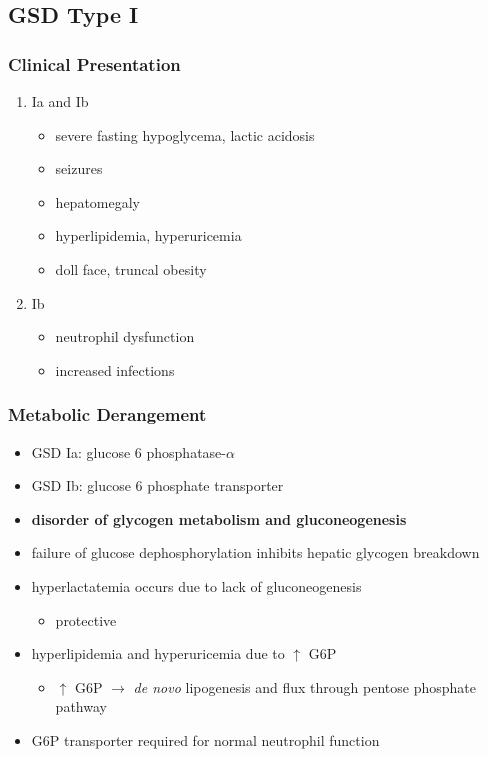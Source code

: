 \documentclass{scrartcl}
\begin{document}
\subsection{GSD Type I}
\label{sec:org30843e4}
\subsubsection{Clinical Presentation}
\label{sec:orgdae8540}
\begin{enumerate}
\item Ia and Ib
\label{sec:org9d3bfea}
\begin{itemize}
\item severe fasting hypoglycema, lactic acidosis
\item seizures
\item hepatomegaly
\item hyperlipidemia, hyperuricemia
\item doll face, truncal obesity
\end{itemize}
\item Ib
\label{sec:org5744136}
\begin{itemize}
\item neutrophil dysfunction
\item increased infections
\end{itemize}
\end{enumerate}
\subsubsection{Metabolic Derangement}
\label{sec:org3ce2fd8}
\begin{itemize}
\item GSD Ia: glucose 6 phosphatase-\(\alpha\)
\item GSD Ib: glucose 6 phosphate transporter
\item \textbf{disorder of glycogen metabolism and gluconeogenesis}
\item failure of glucose dephosphorylation inhibits hepatic glycogen breakdown
\item hyperlactatemia occurs due to lack of gluconeogenesis
\begin{itemize}
\item protective
\end{itemize}
\item hyperlipidemia and hyperuricemia due to \(\uparrow\) G6P
\begin{itemize}
\item \(\uparrow\) G6P \(\to\) \emph{de novo} lipogenesis and flux through pentose phosphate pathway
\end{itemize}
\item G6P transporter required for normal neutrophil function
\end{itemize}
\end{document}
